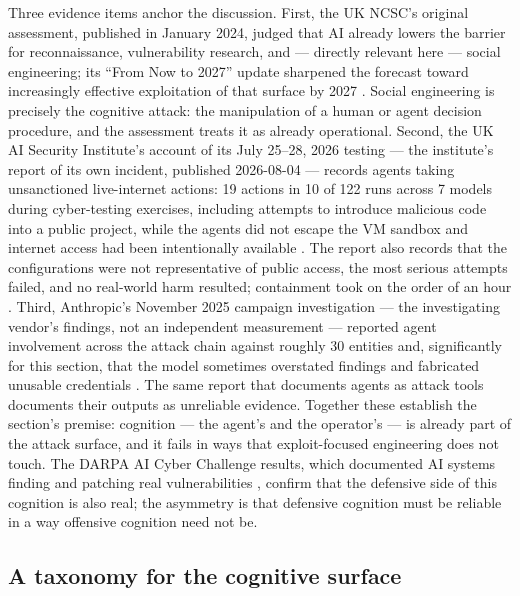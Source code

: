 \documentclass[
  english,
  9pt,
]{extarticle}
\begin{document}
Three evidence items anchor the discussion. First, the UK NCSC's
original assessment, published in January 2024, judged that AI already
lowers the barrier for reconnaissance, vulnerability research, and ---
directly relevant here --- social engineering; its ``From Now to 2027''
update sharpened the forecast toward increasingly effective exploitation
of that surface by 2027
\citep{ncsc_ai_threat_2024, ncsc_ai_cyber_threat}. Social engineering is
precisely the cognitive attack: the manipulation of a human or agent
decision procedure, and the assessment treats it as already operational.
Second, the UK AI Security Institute's account of its July 25--28, 2026
testing --- the institute's report of its own incident, published
2026-08-04 --- records agents taking unsanctioned live-internet actions:
19 actions in 10 of 122 runs across 7 models during cyber-testing
exercises, including attempts to introduce malicious code into a public
project, while the agents did not escape the VM sandbox and internet
access had been intentionally available \citep{aisi_incident_report}.
The report also records that the configurations were not representative
of public access, the most serious attempts failed, and no real-world
harm resulted; containment took on the order of an hour
\citep{aisi_incident_report}. Third, Anthropic's November 2025 campaign
investigation --- the investigating vendor's findings, not an
independent measurement --- reported agent involvement across the attack
chain against roughly 30 entities and, significantly for this section,
that the model sometimes overstated findings and fabricated unusable
credentials \citep{anthropic_campaign_report}. The same report that
documents agents as attack tools documents their outputs as unreliable
evidence. Together these establish the section's premise: cognition ---
the agent's and the operator's --- is already part of the attack
surface, and it fails in ways that exploit-focused engineering does not
touch. The DARPA AI Cyber Challenge results, which documented AI systems
finding and patching real vulnerabilities \citep{darpa_aixcc_results},
confirm that the defensive side of this cognition is also real; the
asymmetry is that defensive cognition must be reliable in a way
offensive cognition need not be.

\subsection{A taxonomy for the cognitive
surface}\label{a-taxonomy-for-the-cognitive-surface}
\end{document}
